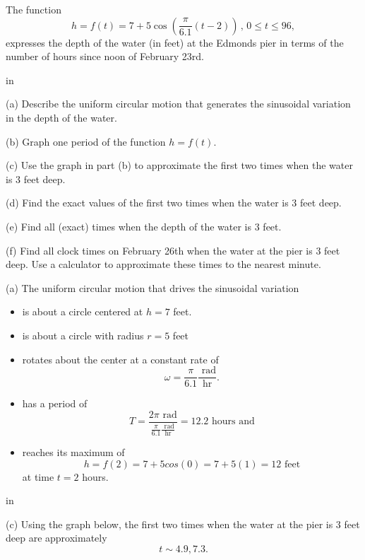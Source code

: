 \documentclass{ximera}
\newcommand{\pskip}{\vskip 0.1 in}
\begin{document}
\begin{example}  \label{Exer67u8gg}
The function
\[
    h  = f(t) = 7 + 5 \cos \left( \frac{\pi}{6.1}(t-2)  \right) \, , \, 0\leq t \leq 96 ,
\]
expresses the depth of the water (in feet) at the Edmonds pier in terms of the number of hours since noon of February 23rd.

\pskip

(a) Describe the uniform circular motion that generates the sinusoidal variation in the depth of the water.

(b) Graph one period of the function $h=f(t)$.

(c) Use the graph in part (b) to approximate the first two times when the water is $3$ feet deep. 

(d) Find the exact values of the first two times when the water is $3$ feet deep.

(e) Find all (exact) times when the depth of the water is $3$ feet.

(f) Find all clock times on February 26th when the water at the pier is $3$ feet deep. Use a calculator to approximate these times to the nearest minute. 


\begin{explanation}
(a) The uniform circular motion that drives the sinusoidal variation

\begin{itemize}

\item{is about a circle centered at $h=7$ feet.}

\item{is about a circle with radius $r=5$ feet}

\item{rotates about the center at a constant rate of 
\[
     \omega = \frac{\pi}{6.1} \frac{ \text{ rad}}{\text{hr}} .
\]}

\item{has a period of
\[
   T =  \frac{2\pi \text{ rad}}{\frac{\pi}{6.1} \frac{ \text{ rad}}{\text{hr}}} = 12.2 \text{ hours and} 
\]}

\item{reaches its maximum of 
\[
   h  = f(2) = 7 + 5 cos(0) = 7 + 5(1) = 12 \text{ feet}
\]
at time $t=2$ hours.}

\end{itemize}

\pskip

(c) Using the graph below, the first two times when the water at the pier is $3$ feet deep are approximately
\[
  t \sim 4.9, 7.3 .
\]


\end{explanation}
\end{example}
\end{document}
